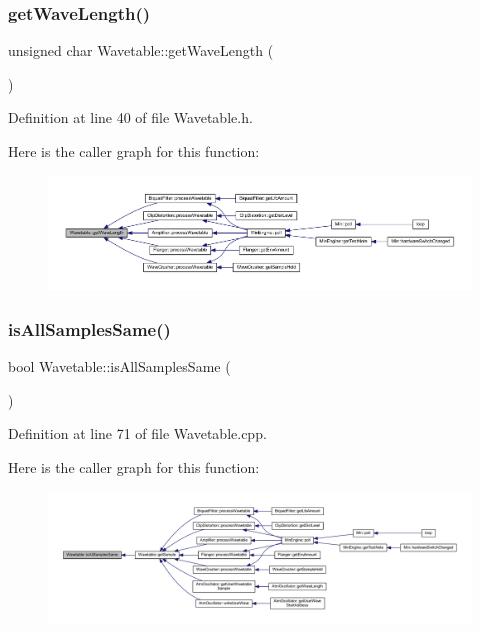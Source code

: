 \subsubsection{\texorpdfstring{get\+Wave\+Length()}{getWaveLength()}}
{\footnotesize\ttfamily unsigned char Wavetable\+::get\+Wave\+Length (\begin{DoxyParamCaption}{ }\end{DoxyParamCaption})\hspace{0.3cm}{\ttfamily [inline]}}



Definition at line 40 of file Wavetable.\+h.

Here is the caller graph for this function\+:
\nopagebreak
\begin{figure}[H]
\begin{center}
\leavevmode
\includegraphics[width=350pt]{class_wavetable_ac7f597021cdace95c4e1e4c88fc36d2a_icgraph}
\end{center}
\end{figure}
\mbox{\label{class_wavetable_aeb61e3ae23fc19d5578c5893323b0490}} 
\subsubsection{\texorpdfstring{is\+All\+Samples\+Same()}{isAllSamplesSame()}}
{\footnotesize\ttfamily bool Wavetable\+::is\+All\+Samples\+Same (\begin{DoxyParamCaption}{ }\end{DoxyParamCaption})}



Definition at line 71 of file Wavetable.\+cpp.

Here is the caller graph for this function\+:
\nopagebreak
\begin{figure}[H]
\begin{center}
\leavevmode
\includegraphics[width=350pt]{class_wavetable_aeb61e3ae23fc19d5578c5893323b0490_icgraph}
\end{center}
\end{figure}
\mbox{\label{class_wavetable_ad54063d548eeb7b1fad18543d4ff15c1}} 
